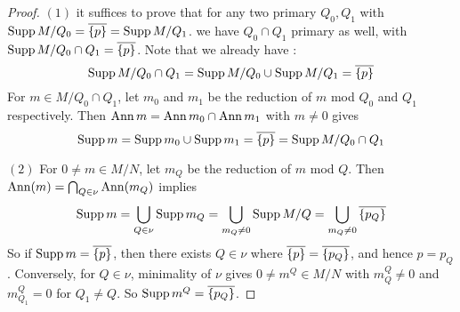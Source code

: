 \begin{proof}
  $(1)$ it suffices to prove that 
  for any two primary $Q_0, Q_1$ with 
  $\operatorname{Supp} M/Q_0 = \overline{\left\{p\right\}} = \operatorname{Supp} M/Q_1$.
  we have $Q_0 \cap Q_1$ primary as well, 
  with $\operatorname{Supp} M/Q_0 \cap Q_1 = \overline{\left\{p\right\}}$.
  Note that we already have : 
  \[
    \operatorname{Supp} M/Q_0 \cap Q_1 = \operatorname{Supp} M/Q_0 \cup \operatorname{Supp} M/Q_1 = \overline{\left\{p\right\}}
  \]
  For $m \in M/Q_0 \cap Q_1$, let $m_0$ and $m_1$ be the reduction of 
  $m$ mod $Q_0$ and $Q_1$ respectively. 
  Then $\operatorname{Ann} m = \operatorname{Ann} m_0 \cap \operatorname{Ann} m_1$ with $m \neq 0$ gives \[
    \operatorname{Supp} m = \operatorname{Supp} m_0 \cup \operatorname{Supp} m_1
    = \overline{\left\{p\right\}} = \operatorname{Supp} M/Q_0 \cap Q_1
  \]

  $(2)$
  For $0 \neq m \in M/N$, let $m_Q$ be the reduction of $m$ mod $Q$.
  Then $\operatorname{Ann} (m) = \bigcap_{Q \in \nu} \operatorname{Ann}(m_Q)$ implies \[
    \operatorname{Supp} m = \bigcup_{Q \in \nu} \operatorname{Supp} m_Q
    = \bigcup_{m_Q \neq 0} \operatorname{Supp} M/Q
    = \bigcup_{m_Q \neq 0} \overline{\left\{p_Q\right\}}
  \]
  So if $\operatorname{Supp} m = \overline{\left\{p\right\}}$,
  then there exists $Q \in \nu$ where 
  $\overline{\left\{p\right\}} = \overline{\left\{p_Q\right\}}$, and hence $p = p_Q$.
  Conversely, for $Q \in \nu$,
  minimality of $\nu$ gives $0 \neq m^Q \in M/N$ with 
  $m^Q_Q \neq 0$ and $m^Q_{Q_1} = 0$ for $Q_1 \neq Q$.
  So $\operatorname{Supp} m^Q = \overline{\left\{p_Q\right\}}$.

\end{proof}